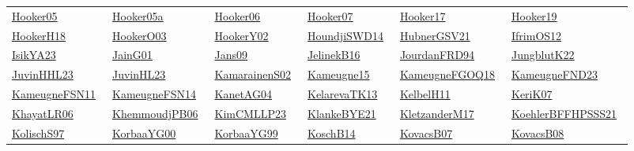 \begin{longtable}{*{6}{l}}
\href{works/Hooker05.pdf}{Hooker05}~\cite{Hooker05} & \href{works/Hooker05a.pdf}{Hooker05a}~\cite{Hooker05a} & \href{works/Hooker06.pdf}{Hooker06}~\cite{Hooker06} & \href{}{Hooker07}~\cite{Hooker07} & \href{works/Hooker17.pdf}{Hooker17}~\cite{Hooker17} & \href{}{Hooker19}~\cite{Hooker19}\\ 
\href{works/HookerH18.pdf}{HookerH18}~\cite{HookerH18} & \href{works/HookerO03.pdf}{HookerO03}~\cite{HookerO03} & \href{works/HookerY02.pdf}{HookerY02}~\cite{HookerY02} & \href{works/HoundjiSWD14.pdf}{HoundjiSWD14}~\cite{HoundjiSWD14} & \href{works/HubnerGSV21.pdf}{HubnerGSV21}~\cite{HubnerGSV21} & \href{works/IfrimOS12.pdf}{IfrimOS12}~\cite{IfrimOS12}\\ 
\href{works/IsikYA23.pdf}{IsikYA23}~\cite{IsikYA23} & \href{}{JainG01}~\cite{JainG01} & \href{}{Jans09}~\cite{Jans09} & \href{works/JelinekB16.pdf}{JelinekB16}~\cite{JelinekB16} & \href{}{JourdanFRD94}~\cite{JourdanFRD94} & \href{works/JungblutK22.pdf}{JungblutK22}~\cite{JungblutK22}\\ 
\href{works/JuvinHHL23.pdf}{JuvinHHL23}~\cite{JuvinHHL23} & \href{works/JuvinHL23.pdf}{JuvinHL23}~\cite{JuvinHL23} & \href{works/KamarainenS02.pdf}{KamarainenS02}~\cite{KamarainenS02} & \href{works/Kameugne15.pdf}{Kameugne15}~\cite{Kameugne15} & \href{works/KameugneFGOQ18.pdf}{KameugneFGOQ18}~\cite{KameugneFGOQ18} & \href{works/KameugneFND23.pdf}{KameugneFND23}~\cite{KameugneFND23}\\ 
\href{works/KameugneFSN11.pdf}{KameugneFSN11}~\cite{KameugneFSN11} & \href{works/KameugneFSN14.pdf}{KameugneFSN14}~\cite{KameugneFSN14} & \href{}{KanetAG04}~\cite{KanetAG04} & \href{works/KelarevaTK13.pdf}{KelarevaTK13}~\cite{KelarevaTK13} & \href{works/KelbelH11.pdf}{KelbelH11}~\cite{KelbelH11} & \href{works/KeriK07.pdf}{KeriK07}~\cite{KeriK07}\\ 
\href{works/KhayatLR06.pdf}{KhayatLR06}~\cite{KhayatLR06} & \href{works/KhemmoudjPB06.pdf}{KhemmoudjPB06}~\cite{KhemmoudjPB06} & \href{works/KimCMLLP23.pdf}{KimCMLLP23}~\cite{KimCMLLP23} & \href{works/KlankeBYE21.pdf}{KlankeBYE21}~\cite{KlankeBYE21} & \href{works/KletzanderM17.pdf}{KletzanderM17}~\cite{KletzanderM17} & \href{works/KoehlerBFFHPSSS21.pdf}{KoehlerBFFHPSSS21}~\cite{KoehlerBFFHPSSS21}\\ 
\href{}{KolischS97}~\cite{KolischS97} & \href{works/KorbaaYG00.pdf}{KorbaaYG00}~\cite{KorbaaYG00} & \href{works/KorbaaYG99.pdf}{KorbaaYG99}~\cite{KorbaaYG99} & \href{works/KoschB14.pdf}{KoschB14}~\cite{KoschB14} & \href{works/KovacsB07.pdf}{KovacsB07}~\cite{KovacsB07} & \href{works/KovacsB08.pdf}{KovacsB08}~\cite{KovacsB08}\\ 

\end{longtable}
